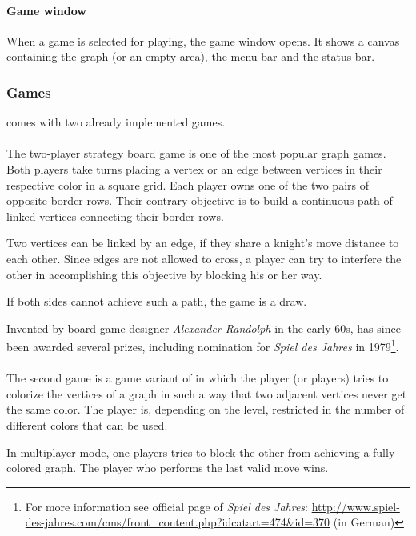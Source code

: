 \paragraph*{Game window}
When a game is selected for playing, the game window opens. It shows a canvas containing the graph (or an empty area), the menu bar and the status bar.\par

\subsubsection{Games}
{\graphioli} comes with two already implemented games.\par
\paragraph*{\twixt}
The two-player strategy board game {\twixt} is one of the most popular graph games. Both players take turns placing a vertex or an edge between vertices in their respective color in a square grid. Each player owns one of the two pairs of opposite border rows. Their contrary objective is to build a continuous \gls{path} of linked vertices connecting their border rows.\par
Two vertices can be linked by an edge, if they share a knight's move distance to each other. Since edges are not allowed to cross, a player can try to interfere the other in accomplishing this objective by blocking his or her way.\par
If both sides cannot achieve such a path, the game is a draw.\par
Invented by board game designer \emph{Alexander Randolph} in the early 60s, {\twixt} has since been awarded several prizes, including nomination for \emph{Spiel des Jahres} in 1979\footnote{For more information see official page of \emph{Spiel des Jahres}: \url{http://www.spiel-des-jahres.com/cms/front_content.php?idcatart=474&id=370} (in German)}.\par
\paragraph*{\graphcoloring}
The second game is a game variant of {\graphcoloring} in which the player (or players) tries to colorize the vertices of a graph in such a way that two \gls{adjacent} vertices never get the same color. The player is, depending on the level, restricted in the number of different colors that can be used.\par
In multiplayer mode, one players tries to block the other from achieving a fully colored graph. The player who performs the last valid move wins.\par